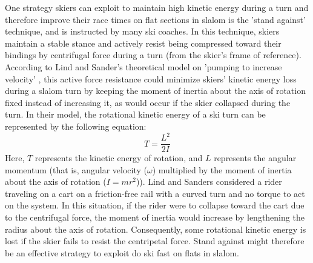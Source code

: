 One strategy skiers can exploit to maintain high kinetic energy during a turn and therefore improve their race times on flat sections in slalom is the 'stand against' technique, and is instructed by many ski coaches. In this technique, skiers maintain a stable stance and actively resist being compressed toward their bindings by centrifugal force during a turn (from the skier's frame of reference). According to Lind and Sander's theoretical model on 'pumping to increase velocity' \cite{lind_physics_2013}, this active force resistance could minimize skiers' kinetic energy loss during a slalom turn by keeping the moment of inertia about the axis of rotation fixed instead of increasing it, as would occur if the skier collapsed during the turn. In their model, the rotational kinetic energy of a ski turn can be represented by the following equation: 
\[ T = \frac{L^2}{2I} \]
Here, $T$ represents the kinetic energy of rotation, and $L$ represents the angular momentum (that is, angular velocity ($\omega$) multiplied by the moment of inertia about the axis of rotation ($I = mr^2$)). Lind and Sanders considered a rider traveling on a cart on a friction-free rail with a curved turn and no torque to act on the system. In this situation, if the rider were to collapse toward the cart due to the centrifugal force, the moment of inertia would increase by lengthening the radius about the axis of rotation. Consequently, some rotational kinetic energy is lost if the skier fails to resist the centripetal force. Stand against might therefore be an effective strategy to exploit do ski fast on flats in slalom.  

